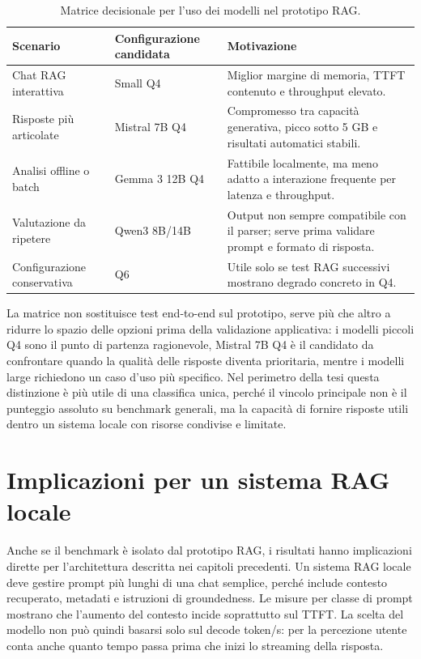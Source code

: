 \begin{table}[ht]
  \centering
  \caption{Matrice decisionale per l'uso dei modelli nel prototipo RAG.}
  \label{tab:deployment_decision_matrix}
  \small
  \begin{tabular}{L{3.2cm}L{3.2cm}L{5.8cm}}
    \toprule
    \textbf{Scenario} & \textbf{Configurazione candidata} &
      \textbf{Motivazione} \\
    \midrule
    Chat RAG interattiva & Small Q4 &
      Miglior margine di memoria, TTFT contenuto e throughput elevato. \\
    Risposte più articolate & Mistral 7B Q4 &
      Compromesso tra capacità generativa, picco sotto 5 GB e risultati
      automatici stabili. \\
    Analisi offline o batch & Gemma 3 12B Q4 &
      Fattibile localmente, ma meno adatto a interazione frequente per latenza
      e throughput. \\
    Valutazione da ripetere & Qwen3 8B/14B &
      Output non sempre compatibile con il parser; serve prima validare prompt
      e formato di risposta. \\
    Configurazione conservativa & Q6 &
      Utile solo se test RAG successivi mostrano degrado concreto in Q4. \\
    \bottomrule
  \end{tabular}
\end{table}

La matrice non sostituisce test end-to-end sul prototipo, serve più che altro a ridurre lo
spazio delle opzioni prima della validazione applicativa: i modelli piccoli Q4
sono il punto di partenza ragionevole, Mistral 7B Q4 è il candidato da
confrontare quando la qualità delle risposte diventa prioritaria, mentre i
modelli large richiedono un caso d'uso più specifico. Nel perimetro della tesi
questa distinzione è più utile di una classifica unica, perché il vincolo
principale non è il punteggio assoluto su benchmark generali, ma la capacità di
fornire risposte utili dentro un sistema locale con risorse condivise e limitate.

\section{Implicazioni per un sistema RAG locale}
\label{sec:evaluation_rag_implications}

Anche se il benchmark è isolato dal prototipo RAG, i risultati hanno
implicazioni dirette per l'architettura descritta nei capitoli precedenti. Un
sistema RAG locale deve gestire prompt più lunghi di una chat semplice, perché
include contesto recuperato, metadati e istruzioni di groundedness. Le misure
per classe di prompt mostrano che l'aumento del contesto incide soprattutto sul
TTFT. La scelta del modello non può quindi basarsi solo sul decode token/s: per
la percezione utente conta anche quanto tempo passa prima che inizi lo streaming
della risposta.

